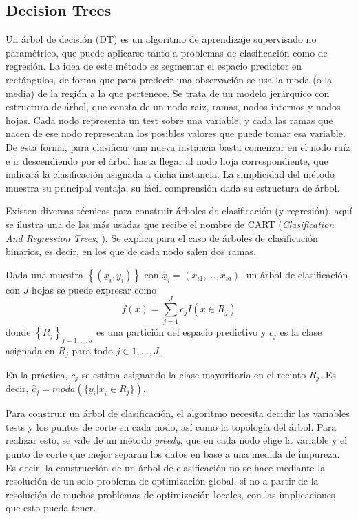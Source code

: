 \documentclass[12pt,a4paper,]{book}
\numberwithin{dummy}{section}
\theoremstyle{ocrenumbox}
\theoremstyle{blacknumex}
\theoremstyle{blacknumbox}
\theoremstyle{ocrenum}
\theoremstyle{ocrenum}
\begin{document}
\hypertarget{decision-trees}{%
\subsection{Decision Trees}\label{decision-trees}}

Un árbol de decisión (DT) es un algoritmo de aprendizaje supervisado no
paramétrico, que puede aplicarse tanto a problemas de clasificación como
de regresión. La idea de este método es segmentar el espacio predictor
en rectángulos, de forma que para predecir una observación se usa la
moda (o la media) de la región a la que pertenece. Se trata de un modelo
jerárquico con estructura de árbol, que consta de un nodo raiz, ramas,
nodos internos y nodos hojas. Cada nodo representa un test sobre una
variable, y cada las ramas que nacen de ese nodo representan los
posibles valores que puede tomar esa variable. De esta forma, para
clasificar una nueva instancia basta comenzar en el nodo raíz e ir
descendiendo por el árbol hasta llegar al nodo hoja correspondiente, que
indicará la clasificación asignada a dicha instancia. La simplicidad del
método muestra su principal ventaja, su fácil comprensión dada su
estructura de árbol.

Existen diversas técnicas para construir árboles de clasificación (y
regresión), aquí se ilustra una de las más usadas que recibe el nombre
de CART (\emph{Clasification And Regression Trees},
\citet{breiman1984classification}). Se explica para el caso de árboles
de clasificación binarios, es decir, en los que de cada nodo salen dos
ramas.

Dada una muestra \(\left\{ (\underline x_i,y_i) \right\}\) con
\(\underline x_i = (x_{i1},...,x_{id})\), un árbol de clasificación con
\(J\) hojas se puede expresar como
\[f(\underline x) = \sum_{j=1}^J c_j I(\underline x \in R_j)\] donde
\(\left\{ R_j\right\}_{j=1,...,J}\) es una partición del espacio
predictivo y \(c_j\) es la clase asignada en \(R_j\) para todo
\(j \in {1,...,J}\).

En la práctica, \(c_j\) se estima asignando la clase mayoritaria en el
recinto \(R_j\). Es decir,
\(\hat c_j = moda(\{y_i | \underline x_i \in R_j\})\).

Para construir un árbol de clasificación, el algoritmo necesita decidir
las variables tests y los puntos de corte en cada nodo, así como la
topología del árbol. Para realizar esto, se vale de un método
\emph{greedy}, que en cada nodo elige la variable y el punto de corte
que mejor separan los datos en base a una medida de impureza. Es decir,
la construcción de un árbol de clasificación no se hace mediante la
resolución de un solo problema de optimización global, si no a partir de
la resolución de muchos problemas de optimización locales, con las
implicaciones que esto pueda tener.
\end{document}
